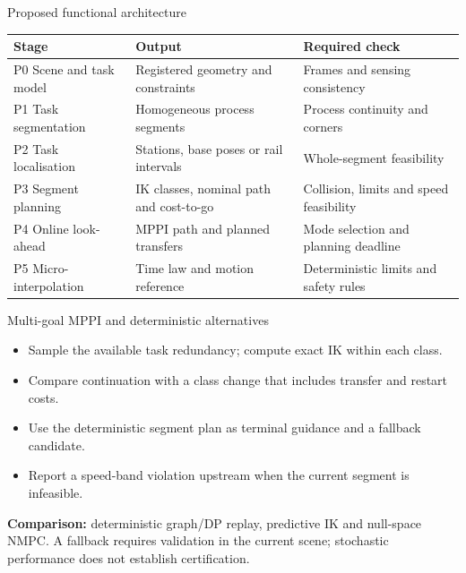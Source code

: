 \documentclass[aspectratio=169,10pt]{beamer}
\begin{document}
\begin{frame}{Proposed functional architecture}
\small\renewcommand{\arraystretch}{1.25}
\begin{tabularx}{\textwidth}{@{}p{}XX@{}}
\toprule
Stage & Output & Required check\\\midrule
P0 Scene and task model & Registered geometry and constraints & Frames and sensing consistency\\
P1 Task segmentation & Homogeneous process segments & Process continuity and corners\\
P2 Task localisation & Stations, base poses or rail intervals & Whole-segment feasibility\\
P3 Segment planning & IK classes, nominal path and cost-to-go & Collision, limits and speed feasibility\\
P4 Online look-ahead & MPPI path and planned transfers & Mode selection and planning deadline\\
P5 Micro-interpolation & Time law and motion reference & Deterministic limits and safety rules\\\bottomrule
\end{tabularx}
\end{frame}

\begin{frame}{Multi-goal MPPI and deterministic alternatives}
\begin{itemize}\items
\item Sample the available task redundancy; compute exact IK within each class.
\item Compare continuation with a class change that includes transfer and restart costs.
\item Use the deterministic segment plan as terminal guidance and a fallback candidate.
\item Report a speed-band violation upstream when the current segment is infeasible.
\end{itemize}
\small
\textbf{Comparison:} deterministic graph/DP replay, predictive IK and null-space NMPC. A fallback requires validation in the current scene; stochastic performance does not establish certification.
\end{frame}
\end{document}

